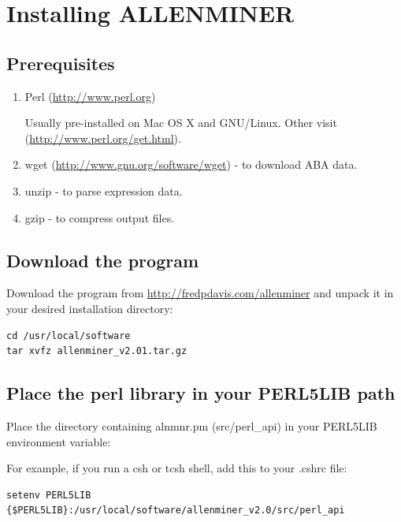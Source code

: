\documentclass[10pt]{article}
\begin{document}
\tableofcontents


\section{Installing ALLENMINER}

\subsection{Prerequisites}
\begin{enumerate}\itemsep0pt
\item Perl (\url{http://www.perl.org})

Usually pre-installed on Mac OS X and GNU/Linux. Other visit (\url{http://www.perl.org/get.html}).

\item wget (\url{http://www.gnu.org/software/wget}) - to download ABA data.

\item unzip - to parse expression data.

\item gzip - to compress output files.
\end{enumerate}


\subsection{Download the program}

Download the program from \url{http://fredpdavis.com/allenminer} and unpack it in your desired installation directory:
\lstset{breaklines=true,language=bash}
\lstset{frame=single}
\lstset{basicstyle=\ttfamily}
\begin{lstlisting}
cd /usr/local/software
tar xvfz allenminer_v2.01.tar.gz
\end{lstlisting}


\subsection{Place the perl library in your PERL5LIB path}

Place the directory containing alnmnr.pm (src/perl\_api) in your PERL5LIB environment variable:

For example, if you run a csh or tcsh shell, add this to your .cshrc file:
\begin{lstlisting}
setenv PERL5LIB {$PERL5LIB}:/usr/local/software/allenminer_v2.0/src/perl_api
\end{lstlisting}
\end{document}
